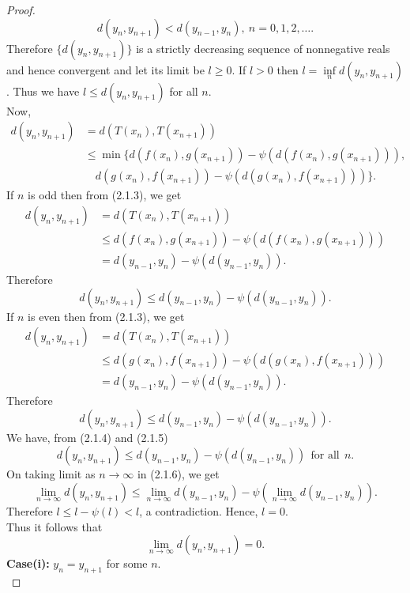 \documentclass[11]{article}
\numberwithin{equation}{definition}
\begin{document}
\begin{proof}
\[d(y_{n},y_{n+1})<d(y_{n-1},y_{n}),\ n=0,1,2,\ldots.\]
Therefore $\{d(y_{n},y_{n+1})\}$ is a strictly decreasing sequence of nonnegative reals and hence convergent and let its limit be $l\geq 0$.
If $l>0$ then $l=\inf\limits_{n}d(y_{n},y_{n+1})$.
Thus we have $l\leq d(y_{n},y_{n+1})$ for all $n$.\\
Now,
\begin{align}
d(y_{n},y_{n+1}) &= d(T(x_{n}),T(x_{n+1})) \nonumber \\
&\leq \min\{d(f(x_{n}),g(x_{n+1}))-\psi(d(f(x_{n}),g(x_{n+1}))), \nonumber \\
&\quad d(g(x_{n}),f(x_{n+1}))-\psi(d(g(x_{n}),f(x_{n+1})))\}.
\end{align}
If $n$ is odd then from (2.1.3), we get
\begin{align}
d(y_{n},y_{n+1}) &= d(T(x_{n}),T(x_{n+1})) \nonumber \\
&\leq d(f(x_{n}),g(x_{n+1}))-\psi(d(f(x_{n}),g(x_{n+1}))) \nonumber \\
&= d(y_{n-1},y_{n})-\psi(d(y_{n-1},y_{n})).\nonumber
\end{align}
Therefore
\begin{equation}
    d(y_{n},y_{n+1})\leq d(y_{n-1},y_{n})-\psi(d(y_{n-1},y_{n})).
\end{equation}
If $n$ is even then from (2.1.3), we get
\begin{align}
d(y_{n},y_{n+1}) &= d(T(x_{n}),T(x_{n+1})) \nonumber \\
&\leq d(g(x_{n}),f(x_{n+1}))-\psi(d(g(x_{n}),f(x_{n+1}))) \nonumber \\
&= d(y_{n-1},y_{n})-\psi(d(y_{n-1},y_{n})).\nonumber
\end{align}
Therefore
\begin{equation}
    d(y_{n},y_{n+1})\leq d(y_{n-1},y_{n})-\psi(d(y_{n-1},y_{n})).
\end{equation}
We have, from (2.1.4) and (2.1.5)
\begin{equation}
d(y_{n},y_{n+1})\leq d(y_{n-1},y_{n})-\psi(d(y_{n-1},y_{n}))\ \ \text{for all}\ \ n.
\end{equation}
On taking limit as $n\to\infty$ in (2.1.6), we get
\[
\lim\limits_{n\to\infty}d(y_{n},y_{n+1})\leq\lim\limits_{n\to\infty}d(y_{n-1},y_{n})-\psi(\lim\limits_{n\to\infty}d(y_{n-1},y_{n})).
\]
Therefore $l\leq l-\psi(l)<l$, a contradiction.
Hence, $l=0$.\\
Thus it follows that
\[
\lim_{n\to\infty}d(y_n, y_{n+1}) = 0.
\]
\textbf{Case(i):}  $y_n = y_{n+1}$ for some $n$.\\

\end{proof}
\end{document}
